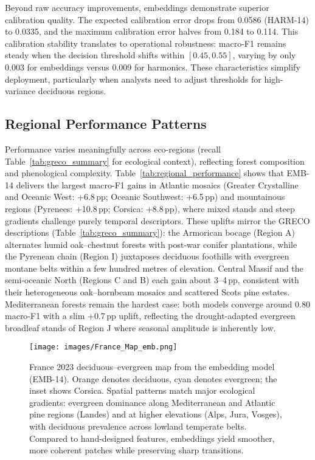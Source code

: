 \documentclass[utf8]{FrontiersinHarvard}
\begin{document}
Beyond raw accuracy improvements, embeddings demonstrate superior calibration quality. The expected calibration error drops from 0.0586 (HARM-14) to 0.0335, and the maximum calibration error halves from 0.184 to 0.114. This calibration stability translates to operational robustness: macro-F1 remains steady when the decision threshold shifts within \([0.45,0.55]\), varying by only 0.003 for embeddings versus 0.009 for harmonics. These characteristics simplify deployment, particularly when analysts need to adjust thresholds for high-variance deciduous regions.

\subsection{Regional Performance Patterns}

Performance varies meaningfully across eco-regions (recall Table~\ref{tab:greco_summary} for ecological context), reflecting forest composition and phenological complexity. Table~\ref{tab:regional_performance} shows that EMB-14 delivers the largest macro-F1 gains in Atlantic mosaics (Greater Crystalline and Oceanic West: +6.8\,pp; Oceanic Southwest: +6.5\,pp) and mountainous regions (Pyrenees: +10.8\,pp; Corsica: +8.8\,pp), where mixed stands and steep gradients challenge purely temporal descriptors. These uplifts mirror the GRECO descriptions (Table~\ref{tab:greco_summary}): the Armorican bocage (Region A) alternates humid oak–chestnut forests with post-war conifer plantations, while the Pyrenean chain (Region I) juxtaposes deciduous foothills with evergreen montane belts within a few hundred metres of elevation. Central Massif and the semi-oceanic North (Regions C and B) each gain about 3–4\,pp, consistent with their heterogeneous oak–hornbeam mosaics and scattered Scots pine estates. Mediterranean forests remain the hardest case: both models converge around \(0.80\) macro-F1 with a slim +0.7\,pp uplift, reflecting the drought-adapted evergreen broadleaf stands of Region J where seasonal amplitude is inherently low.

\begin{figure}[H]
    \centering
    \texttt{[image: images/France\_Map\_emb.png]}
    \caption{France 2023 deciduous--evergreen map from the embedding model (EMB-14). Orange denotes deciduous, cyan denotes evergreen; the inset shows Corsica. Spatial patterns match major ecological gradients: evergreen dominance along Mediterranean and Atlantic pine regions (Landes) and at higher elevations (Alps, Jura, Vosges), with deciduous prevalence across lowland temperate belts. Compared to hand-designed features, embeddings yield smoother, more coherent patches while preserving sharp transitions.}
    \label{fig:national_map}
\end{figure}
\end{document}
